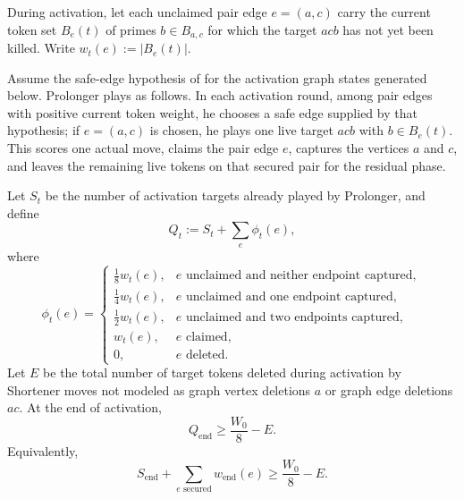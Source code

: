 \begin{proposition}\label{prop:t2-activation-potential}
During activation, let each unclaimed pair edge $e=(a,c)$ carry the current
token set $B_e(t)$ of primes $b\in B_{a,c}$ for which the target $acb$ has not
yet been killed.  Write $w_t(e):=|B_e(t)|$.

Assume the safe-edge hypothesis of  for the
activation graph states generated below.  Prolonger plays as follows.  In each
activation round, among pair edges with positive current token weight, he
chooses a safe edge supplied by that hypothesis; if $e=(a,c)$ is chosen, he
plays one live target $acb$ with $b\in B_e(t)$.  This scores one actual move,
claims the pair edge $e$, captures the vertices $a$ and $c$, and leaves the
remaining live tokens on that secured pair for the residual phase.

Let $S_t$ be the number of activation targets already played by Prolonger, and
define
\[
  Q_t
  :=
  S_t+\sum_e \phi_t(e),
\]
where
\[
  \phi_t(e)=
  \begin{cases}
    \frac18 w_t(e),& e\text{ unclaimed and neither endpoint captured},\\[1mm]
    \frac14 w_t(e),& e\text{ unclaimed and one endpoint captured},\\[1mm]
    \frac12 w_t(e),& e\text{ unclaimed and two endpoints captured},\\[1mm]
    w_t(e),& e\text{ claimed},\\[1mm]
    0,& e\text{ deleted}.
  \end{cases}
\]
Let $E$ be the total number of target tokens deleted during activation by
Shortener moves not modeled as graph vertex deletions $a$ or graph edge
deletions $ac$.  At the end of activation,
\[
  Q_{\mathrm{end}}\ge \frac{W_0}{8}-E.
\]
Equivalently,
\[
  S_{\mathrm{end}}
  +
  \sum_{e\text{ secured}} w_{\mathrm{end}}(e)
  \ge
  \frac{W_0}{8}-E.
\]
\end{proposition}

